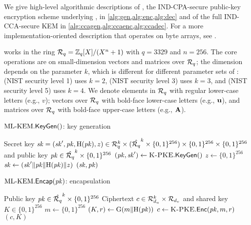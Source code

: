 We give high-level algorithmic descriptions of \kpke, 
the IND-CPA-secure public-key encryption scheme underlying \mlkem,
in \cref{alg:gen,alg:enc,alg:dec} and of the full IND-CCA-secure KEM
in \cref{alg:ccagen,alg:ccaenc,alg:ccadec}. For a more implementation-oriented description 
that operates on byte arrays, see \cite[Algs.~12--14]{fips203}.

\mlkem works in the ring $\mathcal{R}_q = \mathbb{Z}_q[X]/(X^n + 1)$ with $q=3329$ and $n=256$.
The core operations are on small-dimension vectors and matrices over $\mathcal{R}_q$;
the dimension depends on the parameter $k$, which is different for different
parameter sets of \mlkem: 
\mlkem (NIST security level 1) uses $k=2$,
\mlkem (NIST security level 3) uses $k=3$, and
\mlkem (NIST security level 5) uses $k=4$.
We denote elements in $\mathcal{R}_q$ with regular lower-case letters (e.g., $v$);
vectors over $\mathcal{R}_q$ with bold-face lower-case letters (e.g., $\mathbf{u}$),
and matrices over $\mathcal{R}_q$ with bold-face upper-case letters (e.g., $\mathbf{A}$).


\begin{algorithm}[tb]
  \caption{$\text{{ML-KEM}}.\mathsf{KeyGen}()$: key generation}
  \label{alg:ccagen}
  \begin{algorithmic}[1]
    \Ensure Secret key $\mathit{sk} = (\mathit{sk}', \mathit{pk}, \text{H}(\mathit{pk}), z) \in \mathcal{R}_q^k \times (\hat{\mathcal{R}_q}^k \times \{0,1\}^{256}) \times \{0,1\}^{256} \times \{0,1\}^{256}$ and public key $\mathit{pk} \in \hat{\mathcal{R}_q}^k \times \{0,1\}^{256}$
    \State $(\mathit{pk},\mathit{sk}') \gets \text{{\sc K-PKE}}.\mathsf{KeyGen}()$
    \State $z \gets \{0,1\}^{256}$
    \State $\mathit{sk} \gets (\mathit{sk}'\Vert \mathit{pk}\Vert \text{H}(\mathit{pk})\Vert z)$
    \State \Return $(\mathit{sk}, \mathit{pk})$
  \end{algorithmic}
\end{algorithm}


\begin{algorithm}[tb]
  \caption{$\text{{ML-KEM}}.\mathsf{Encap}(\mathit{pk})$: encapsulation}
  \label{alg:ccaenc}
  \begin{algorithmic}[1]
    \Require Public key $\mathit{pk} \in \hat{\mathcal{R}_q}^k \times \{0,1\}^{256}$
    \Ensure Ciphertext $c \in \mathcal{R}_{d_u}^k \times \mathcal{R}_{d_v}$ and shared key $K \in \{0,1\}^{256}$
    \State $m\gets \{0,1\}^{256}$
    \State $(K,r) \gets \text{G}(m\Vert \text{H}(\mathit{pk}))$
    \State $c \gets \text{{\sc K-PKE}}.\mathsf{Enc}(\mathit{pk}, m, r)$
    \State \Return $(c, K)$
  \end{algorithmic}
\end{algorithm}


